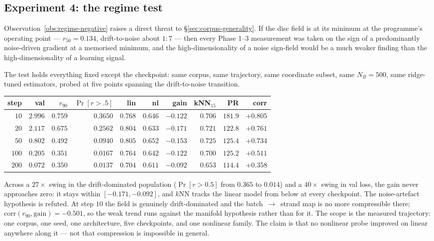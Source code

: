 \subsection{Experiment 4: the regime test}
\label{sec:regime-test}

Observation~\ref{obs:regime-negative} raises a direct threat to
\S\ref{sec:corpus-generality}. If the disc field is at its minimum at the
programme's operating point --- $r_{50}=0.134$, drift-to-noise about $1{:}7$
--- then every Phase 1--3 measurement was taken on the sign of a
predominantly noise-driven gradient at a memorised minimum, and the
high-dimensionality of a noise sign-field would be a much weaker finding than
the high-dimensionality of a learning signal.

The test holds everything fixed except the checkpoint: same corpus, same
trajectory, same coordinate subset, same $N_B=500$, same ridge-tuned
estimators, probed at five points spanning the drift-to-noise transition.

\begin{center}
\begin{tabular}{rrrrrrrrrr}
\hline
step & val & $r_{90}$ & $\Pr[r>.5]$ & lin & nl & gain & kNN$_{15}$ & PR & corr \\
\hline
$10$  & $2.996$ & $0.759$ & $0.3650$ & $0.768$ & $0.646$ & $-0.122$ & $0.706$ & $181.9$ & $+0.805$ \\
$20$  & $2.117$ & $0.675$ & $0.2562$ & $0.804$ & $0.633$ & $-0.171$ & $0.721$ & $122.8$ & $+0.761$ \\
$50$  & $0.802$ & $0.492$ & $0.0940$ & $0.805$ & $0.652$ & $-0.153$ & $0.725$ & $125.4$ & $+0.734$ \\
$100$ & $0.205$ & $0.351$ & $0.0167$ & $0.764$ & $0.642$ & $-0.122$ & $0.700$ & $125.2$ & $+0.511$ \\
$200$ & $0.072$ & $0.350$ & $0.0137$ & $0.704$ & $0.611$ & $-0.092$ & $0.653$ & $114.4$ & $+0.358$ \\
\hline
\end{tabular}
\end{center}

\begin{observation}
\label{obs:wall-general}
Across a $27\times$ swing in the drift-dominated population
($\Pr[r>0.5]$ from $0.365$ to $0.014$) and a $40\times$ swing in val loss, the
gain never approaches zero: it stays within $[-0.171,-0.092]$, and $k$NN tracks
the linear model from below at every checkpoint. The noise-artefact hypothesis
is refuted. At step $10$ the field is genuinely drift-dominated and the
batch~$\to$~strand map is no more compressible there;
$\mathrm{corr}(r_{90},\text{gain})=-0.501$, so the weak trend runs against the
manifold hypothesis rather than for it. The scope is the measured trajectory:
one corpus, one seed, one architecture, five checkpoints, and one nonlinear
family. The claim is that no nonlinear probe improved on linear anywhere along
it --- not that compression is impossible in general.
\end{observation}


